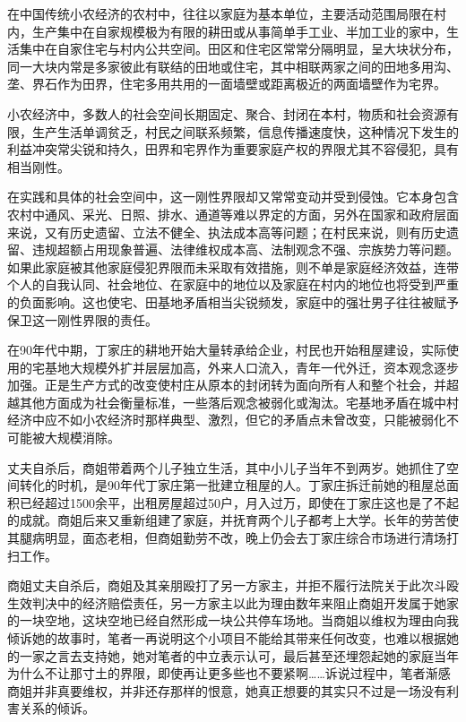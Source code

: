   在中国传统小农经济的农村中，往往以家庭为基本单位，主要活动范围局限在村内，生产集中在自家规模极为有限的耕田或从事简单手工业、半加工业的家中，生活集中在自家住宅与村内公共空间。田区和住宅区常常分隔明显，呈大块状分布，同一大块内常是多家彼此有联结的田地或住宅，其中相联两家之间的田地多用沟、垄、界石作为田界，住宅多用共用的一面墙壁或距离极近的两面墙壁作为宅界。

  小农经济中，多数人的社会空间长期固定、聚合、封闭在本村，物质和社会资源有限，生产生活单调贫乏，村民之间联系频繁，信息传播速度快，这种情况下发生的利益冲突常尖锐和持久，田界和宅界作为重要家庭产权的界限尤其不容侵犯，具有相当刚性。

  在实践和具体的社会空间中，这一刚性界限却又常常变动并受到侵蚀。它本身包含农村中通风、采光、日照、排水、通道等难以界定的方面，另外在国家和政府层面来说，又有历史遗留、立法不健全、执法成本高等问题；在村民来说，则有历史遗留、违规超额占用现象普遍、法律维权成本高、法制观念不强、宗族势力等问题。如果此家庭被其他家庭侵犯界限而未采取有效措施，则不单是家庭经济效益，连带个人的自我认同、社会地位、在家庭中的地位以及家庭在村内的地位也将受到严重的负面影响。这也使宅、田基地矛盾相当尖锐频发，家庭中的强壮男子往往被赋予保卫这一刚性界限的责任。

  在90年代中期，丁家庄的耕地开始大量转承给企业，村民也开始租屋建设，实际使用的宅基地大规模外扩并层层加高，外来人口流入，青年一代外迁，资本观念逐步加强。正是生产方式的改变使村庄从原本的封闭转为面向所有人和整个社会，并超越其他方面成为社会衡量标准，一些落后观念被弱化或淘汰。宅基地矛盾在城中村经济中应不如小农经济时那样典型、激烈，但它的矛盾点未曾改变，只能被弱化不可能被大规模消除。

  丈夫自杀后，商姐带着两个儿子独立生活，其中小儿子当年不到两岁。她抓住了空间转化的时机，是90年代丁家庄第一批建立租屋的人。丁家庄拆迁前她的租屋总面积已经超过1500余平，出租房屋超过50户，月入过万，即使在丁家庄这也是了不起的成就。商姐后来又重新组建了家庭，并抚育两个儿子都考上大学。长年的劳苦使其腿病明显，面态老相，但商姐勤劳不改，晚上仍会去丁家庄综合市场进行清场打扫工作。

  商姐丈夫自杀后，商姐及其亲朋殴打了另一方家主，并拒不履行法院关于此次斗殴生效判决中的经济赔偿责任，另一方家主以此为理由数年来阻止商姐开发属于她家的一块空地，这块空地已经自然形成一块公共停车场地。当商姐以维权为理由向我倾诉她的故事时，笔者一再说明这个小项目不能给其带来任何改变，也难以根据她的一家之言去支持她，她对笔者的中立表示认可，最后甚至还埋怨起她的家庭当年为什么不让那寸土的界限，即使再让更多些也不要紧啊……诉说过程中，笔者渐感商姐并非真要维权，并非还存那样的恨意，她真正想要的其实只不过是一场没有利害关系的倾诉。

